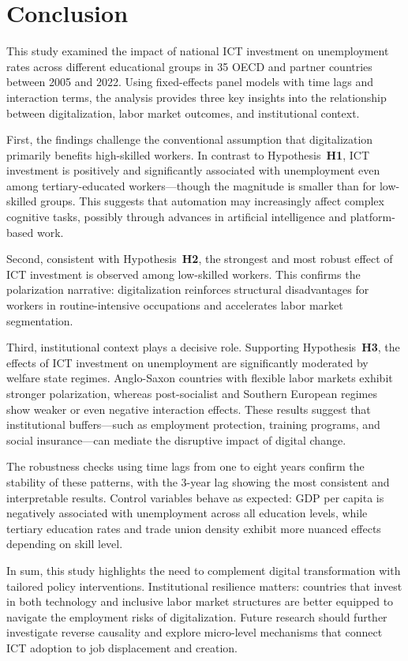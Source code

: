 
\section{Conclusion}

This study examined the impact of national ICT investment on unemployment rates across different 
educational groups in 35 OECD and partner countries between 2005 and 2022. Using fixed-effects panel 
models with time lags and interaction terms, the analysis provides three key insights into the 
relationship between digitalization, labor market outcomes, and institutional context.

First, the findings challenge the conventional assumption that digitalization primarily benefits 
high-skilled workers. In contrast to Hypothesis~\textbf{H1}, ICT investment is positively and 
significantly associated with unemployment even among tertiary-educated workers—though the magnitude 
is smaller than for low-skilled groups. This suggests that automation may increasingly affect 
complex cognitive tasks, possibly through advances in artificial intelligence and platform-based work.

Second, consistent with Hypothesis~\textbf{H2}, the strongest and most robust effect of ICT 
investment is observed among low-skilled workers. This confirms the polarization narrative: 
digitalization reinforces structural disadvantages for workers in routine-intensive occupations and 
accelerates labor market segmentation.

Third, institutional context plays a decisive role. Supporting Hypothesis~\textbf{H3}, the effects of 
ICT investment on unemployment are significantly moderated by welfare state regimes. Anglo-Saxon 
countries with flexible labor markets exhibit stronger polarization, whereas post-socialist and 
Southern European regimes show weaker or even negative interaction effects. These results suggest 
that institutional buffers—such as employment protection, training programs, and social insurance—can 
mediate the disruptive impact of digital change.

The robustness checks using time lags from one to eight years confirm the stability of these 
patterns, with the 3-year lag showing the most consistent and interpretable results. Control 
variables behave as expected: GDP per capita is negatively associated with unemployment across all 
education levels, while tertiary education rates and trade union density exhibit more nuanced effects 
depending on skill level.

In sum, this study highlights the need to complement digital transformation with tailored policy 
interventions. Institutional resilience matters: countries that invest in both technology and 
inclusive labor market structures are better equipped to navigate the employment risks of 
digitalization. Future research should further investigate reverse causality and explore micro-level 
mechanisms that connect ICT adoption to job displacement and creation.
